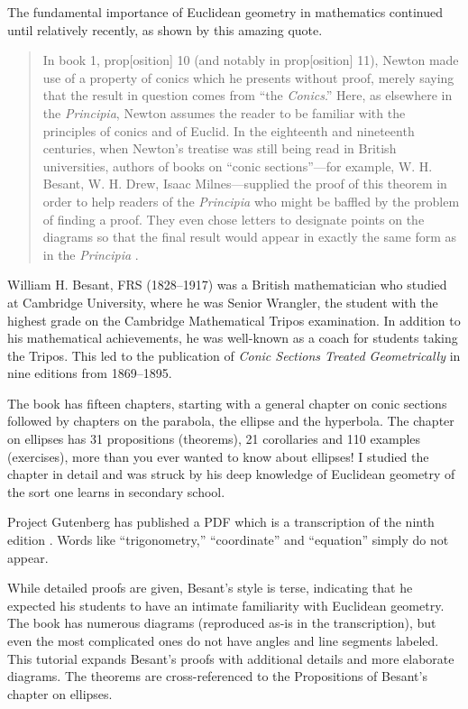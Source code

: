 The fundamental importance of Euclidean geometry in mathematics continued until relatively recently, as shown by this amazing quote.
\begin{quote}
In book 1, prop[osition] 10 (and notably in prop[osition] 11), Newton made use of a property of conics which he presents without proof, merely saying that the result in question comes from ``the \textit{Conics}.'' Here, as elsewhere in the \textit{Principia}, Newton assumes the reader to be familiar with the principles of conics and of Euclid. In the eighteenth and nineteenth centuries, when Newton's treatise was still being read in British universities, authors of books on ``conic sections''---for example, W. H. Besant, W. H. Drew, Isaac Milnes---supplied the proof of this theorem in order to help readers of the \textit{Principia} who might be baffled by the problem of finding a proof. They even chose letters to designate points on the diagrams so that the final result would appear in exactly the same form as in the \textit{Principia} \cite[p.~330]{newton-cohen}.
\end{quote}

William H. Besant, FRS (1828--1917) was a British mathematician who studied at Cambridge University, where he was Senior Wrangler, the student with the highest grade on the Cambridge Mathematical Tripos examination. In addition to his mathematical achievements, he was well-known as a coach for students taking the Tripos. This led to the publication of \textit{Conic Sections Treated Geometrically} in nine editions from 1869--1895.

The book has fifteen chapters, starting with a general chapter on conic sections followed by chapters on the parabola, the ellipse and the hyperbola. The chapter on ellipses has 31 propositions (theorems), 21 corollaries and 110 examples (exercises), more than you ever wanted to know about ellipses! I studied the chapter in detail and was struck by his deep knowledge of Euclidean geometry of the sort one learns in secondary school.

Project Gutenberg has published a PDF which is a transcription of the ninth edition \cite{besant}. Words like ``trigonometry,'' ``coordinate'' and ``equation'' simply do not appear.

While detailed proofs are given, Besant's style is terse, indicating that he expected his students to have an intimate familiarity with Euclidean geometry. The book has numerous diagrams (reproduced as-is in the transcription), but even the most complicated ones do not have angles and line segments labeled. This tutorial expands Besant's proofs with additional details and more elaborate diagrams. The theorems are cross-referenced to the Propositions of Besant's chapter on ellipses.

